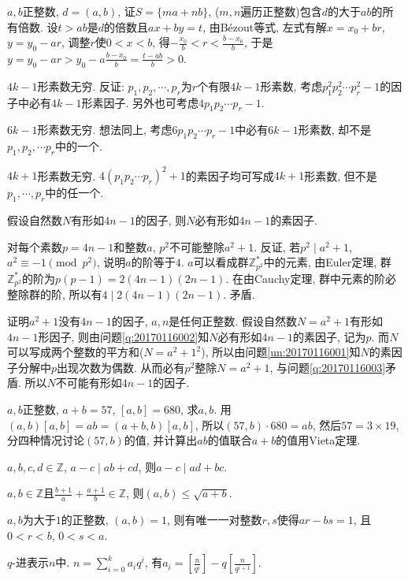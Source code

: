 \bq{}{}
$a,b$正整数, $d=(a,b)$, 证$S=\{ma+nb\}$, ($m,n$遍历正整数)包含$d$的大于$ab$的所有倍数.
\eq
\ba
设$t>ab$是$d$的倍数且$ax+by=t$, 由B\'{e}zout等式, 左式有解$x=x_0+br$, $y=y_0-ar$, 调整$r$使$0<x<b$, 得$-\frac{x_0}{b}<r<\frac{b-x_0}{b}$,
于是$y=y_0-ar>y_0-a\frac{b-x_0}{b}=\frac{t-ab}{b}>0$.
\ea

\bq{}{}
$4k-1$形素数无穷.
\eq
\ba
反证: $p_1, p_2, \cdots, p_r$为$r$个有限$4k-1$形素数, 考虑$p_1^2p_2^2\cdots p_r^2-1$的因子中必有$4k-1$形素因子.
另外也可考虑$4p_1p_2\cdots p_r-1$.
\ea

\bq{}{}
$6k-1$形素数无穷.
\eq
\ba
想法同上, 考虑$6p_1p_2\cdots p_{r}-1$中必有$6k-1$形素数, 却不是$p_1,p_2,\cdots p_r$中的一个.
\ea

\bq{}{}
$4k+1$形素数无穷.
\eq
\ba
$4(p_1p_2\cdots p_r)^2+1$的素因子均可写成$4k+1$形素数, 但不是$p_1, \cdots, p_r$中的任一个.
\ea

假设自然数$N$有形如$4n-1$的因子, 则$N$必有形如$4n-1$的素因子.
\eq

对每个素数$p=4n-1$和整数$a$, $p^2$不可能整除$a^2+1$.
\eq
\ba
反证, 若$p^2\mid a^2+1$, $a^2\equiv-1\pmod{p^2}$, 说明$a$的阶等于$4$. $a$可以看成群$\mathbb{Z}_{p^2}^{*}$中的元素, 
由Euler定理, 群$\mathbb{Z}_{p^2}^{*}$的阶为$p(p-1)=2(4n-1)(2n-1)$. 在由Cauchy定理, 群中元素的阶必整除群的阶, 
所以有$4\mid2(4n-1)(2n-1)$. 矛盾.
\ea

\bq{}{}
证明$a^2+1$没有$4n-1$的因子, $a, n$是任何正整数.
\eq
\ba
假设自然数$N=a^2+1$有形如$4n-1$形因子, 则由问题\ref{q:20170116002}知$N$必有形如$4n-1$的素因子, 记为$p$.
而$N$可以写成两个整数的平方和($N=a^2+1^2$), 所以由问题\ref{un:20170116001}知$N$的素因子分解中$p$出现次数为偶数.
从而必有$p^2$整除$N=a^2+1$, 与问题\ref{q:20170116003}矛盾. 所以$N$不可能有形如$4n-1$的因子.
\ea

\bq{}{}
$a,b$正整数, $a+b=57$, $[a,b]=680$, 求$a,b$.
\eq
\ba
用$(a,b)[a,b]=ab=(a+b,b)[a,b]$, 所以$(57,b)\cdot 680=ab$, 然后$57=3\times19$, 分四种情况讨论$(57,b)$的值,
并计算出$ab$的值联合$a+b$的值用Vieta定理.
\ea

\bq{}{}
$a,b,c,d\in\mathbb{Z}$, $a-c\mid ab+cd$, 则$a-c\mid ad+bc$.
\eq

\bq{}{}
$a,b\in\mathbb{Z}$且$\frac{b+1}{a}+\frac{a+1}{b}\in\mathbb{Z}$, 则$(a,b)\le\sqrt{a+b}$.
\eq

\bq{}{}
$a,b$为大于$1$的正整数, $(a,b)=1$, 则有唯一一对整数$r,s$使得$ar-bs=1$, 且$0<r<b$, $0<s<a$.
\eq

\bq{}{}
$q$-进表示$n$中. $n=\sum_{i=0}^{k}a_iq^i$, 有$a_{i}=\left[\frac{n}{q^i}\right]-q\left[\frac{n}{q^{i+1}}\right]$.
\eq

